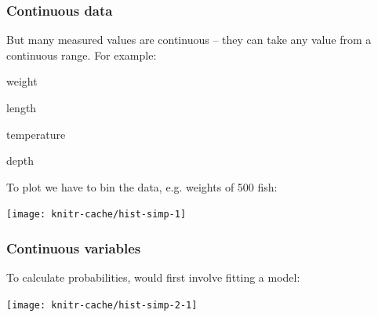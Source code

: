 
%
%
%
%
%
%
%
%
%
%
%
%
%

\begin{frame}
\frametitle{Continuous data}


But many measured values are \alert{continuous} -- they can take any value from
a continuous range. For example:

\bi
\item weight
\item length
\item temperature
\item depth
\ei

To plot we have to bin the data, e.g. weights of 500 fish:

\begin{knitrout}
\color{fgcolor}
\texttt{[image: knitr-cache/hist-simp-1]}

\end{knitrout}




\end{frame}

\begin{frame}
\frametitle{Continuous variables}

To calculate probabilities, would first involve fitting a model:

\begin{knitrout}
\color{fgcolor}
\texttt{[image: knitr-cache/hist-simp-2-1]}

\end{knitrout}

\end{frame}

